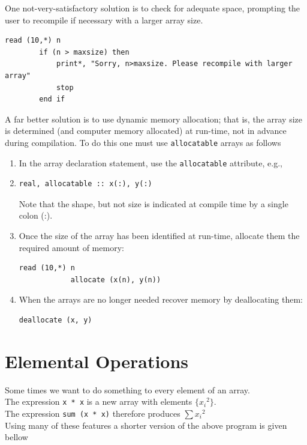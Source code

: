 \documentclass[12pt,oneside]{book}
\newcommand{\code}[1]{\lstinline[keywordstyle=\color{black},basicstyle=\ttfamily]{#1}}
\begin{document}
    One not-very-satisfactory solution is to check for adequate space, prompting the user to recompile if necessary with a larger array size.
    \begin{lstlisting}[numbers=none]
        read (10,*) n
        if (n > maxsize) then
            print*, "Sorry, n>maxsize. Please recompile with larger array"
            stop
        end if
    \end{lstlisting}
    A far better solution is to use dynamic memory allocation; that is, the array size is determined (and computer memory allocated) at run-time, not in advance during compilation. To do this one must use \code{allocatable} arrays as follows\begin{enumerate}
        \item In the array declaration statement, use the \code{allocatable} attribute, e.g.,
        \item \begin{lstlisting}[numbers=none]
            real, allocatable :: x(:), y(:)
        \end{lstlisting}
        Note that the shape, but not size is indicated at compile time by a single colon (:).
        \item Once the size of the array has been identified at run-time, allocate them the required amount of memory:
        \begin{lstlisting}[numbers=none]
            read (10,*) n
            allocate (x(n), y(n))
        \end{lstlisting}
        \item When the arrays are no longer needed recover memory by deallocating them:
        \begin{lstlisting}[numbers=none]
            deallocate (x, y)
        \end{lstlisting}
    \end{enumerate}
    \section{Elemental Operations}
    Some times we want to do something to every element of an array.\\The expression \code{x * x} is a new array with elements $ \{{x_i}^2\} $.\\
    The expression \code{sum (x * x)} therefore produces $ \sum {x_i}^2 $\\
    Using many of these features a shorter version of the above program is given bellow
    
\end{document}

